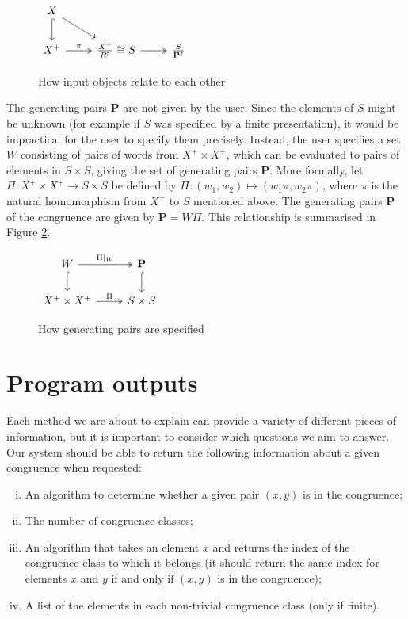 \begin{figure}[ht]
  \centering
  $\begin{tikzcd}
    X \arrow[dr] \arrow[d, hook] & \\
    X^+ \arrow[r, two heads, "\pi"] & \frac{X^+}{R^\sharp} \cong S \arrow[r, two heads] & \frac{S}{\mathbf{P}^\sharp}
  \end{tikzcd}$
  \caption{How input objects relate to each other}
  \label{fig:pairs-cd-1}
\end{figure}

The generating pairs $\mathbf{P}$ are not given by the user.  Since the elements
of $S$ might be unknown (for example if $S$ was specified by a finite
presentation), it would be impractical for the user to specify them precisely.
Instead, the user specifies a set $W$ consisting of pairs of words from
$X^+ \times X^+$, which can be evaluated to pairs of elements in $S \times S$,
giving the set of generating pairs $\mathbf{P}$.
More formally, let
$\Pi: X^+ \times X^+ \to S \times S$ be defined by
$\Pi: (w_1, w_2) \mapsto (w_1\pi, w_2\pi)$, where $\pi$ is the natural
homomorphism from $X^+$ to $S$ mentioned above.  The generating pairs
$\mathbf{P}$ of the congruence are given by $\mathbf{P} = W \Pi$.
This relationship is summarised in Figure \ref{fig:pairs-cd-2}.

\begin{figure}[ht]
  \centering
  $\begin{tikzcd}
    W \arrow[r, two heads, "\Pi|_W"] \arrow[d, hook] & \mathbf{P} \arrow[d, hook] \\
    X^+ \times X^+ \arrow[r, two heads, "\Pi"] & S \times S
  \end{tikzcd}$
  \caption{How generating pairs are specified}
  \label{fig:pairs-cd-2}
\end{figure}

\section{Program outputs}
\label{sec:program-outputs}

Each method we are about to explain can provide a variety of different pieces of
information, but it is important to consider which questions we aim to answer.
Our system should be able to return the following information about a given
congruence when requested:

\begin{enumerate}[(i)]
\item An algorithm to determine whether a given pair $(x,y)$ is in the
  congruence;
\item The number of congruence classes;
\item An algorithm that takes an element $x$ and returns the index of the
  congruence class to which it belongs (it should return the same index for
  elements $x$ and $y$ if and only if $(x,y)$ is in the congruence);
\item A list of the elements in each non-trivial congruence class (only if
  finite).
\end{enumerate}

